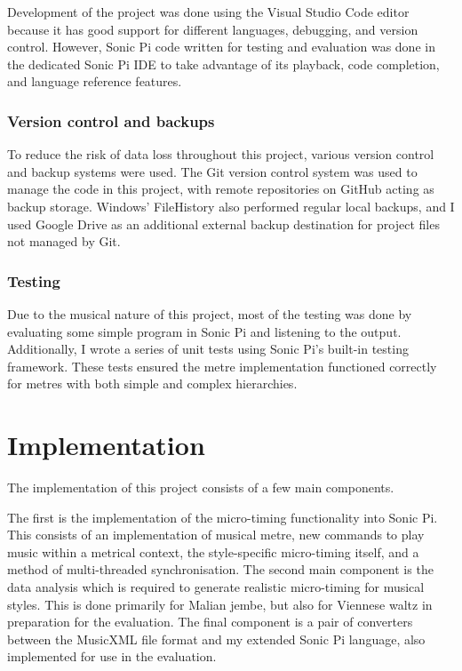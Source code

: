 \documentclass[12pt,twoside,openright]{report}
\begin{document}
Development of the project was done using the Visual Studio Code editor because
it has good support for different languages, debugging, and version control.
However, Sonic Pi code written for testing and evaluation was done in the
dedicated Sonic Pi IDE to take advantage of its playback, code completion, and
language reference features.


\subsection{Version control and backups}

To reduce the risk of data loss throughout this project, various version control
and backup systems were used. The Git version control system was used to manage
the code in this project, with remote repositories on GitHub acting as backup
storage. Windows' FileHistory also performed regular local backups, and I used
Google Drive as an additional external backup destination for project files not
managed by Git.


\subsection{Testing}

Due to the musical nature of this project, most of the testing was done by
evaluating some simple program in Sonic Pi and listening to the output.
Additionally, I wrote a series of unit tests using Sonic Pi's built-in testing
framework. These tests ensured the metre implementation functioned correctly for
metres with both simple and complex hierarchies.





\chapter{Implementation} \label{implementation}

The implementation of this project consists of a few main components.

The first is the implementation of the micro-timing functionality into Sonic Pi.
This consists of an implementation of musical metre, new commands to play music
within a metrical context, the style-specific micro-timing itself, and a method
of multi-threaded synchronisation. The second main component is the data
analysis which is required to generate realistic micro-timing for musical styles.
This is done primarily for Malian jembe, but also for Viennese waltz in
preparation for the evaluation. The final component is a pair of converters
between the MusicXML file format and my extended Sonic Pi language, also
implemented for use in the evaluation.
\end{document}
